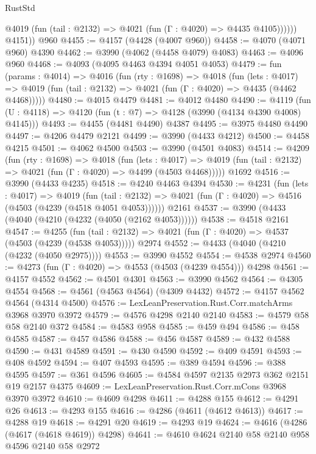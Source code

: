 \begin{lexlean}{RustStd}
\begin{coremodule}
              @4019 (fun (tail : @2132) => @4021 (fun (Γ : @4020) => @4435 @4105))))))
        @4151))
    @960
@4455 := @4157 (@4428 (@4007 @960))
@4458 := @4070 (@4071 @960) @4390
@4462 := @3990 (@4062 (@4458 @4079) @4083)
@4463 := @4096 @960
@4468 := @4093 (@4095 @4463 @4394 @4051 @4053)
@4479 := fun (params : @4014) =>
  @4016
    (fun (rty : @1698) =>
    @4018
      (fun (lets : @4017) =>
      @4019 (fun (tail : @2132) => @4021 (fun (Γ : @4020) => @4435 (@4462 @4468)))))
@4480 := @4015 @4479
@4481 := @4012 @4480
@4490 := @4119 (fun (U : @4118) => @4120 (fun (t : @7) => @4128 (@3990 (@4134 @4390 @4008) @4145)))
@4493 := @4455 (@4481 @4490) @4387
@4495 := @3975 @4480 @4490
@4497 := @4206 @4479 @2121
@4499 := @3990 (@4433 @4212)
@4500 := @4458 @4215
@4501 := @4062 @4500
@4503 := @3990 (@4501 @4083)
@4514 := @4209
    (fun (rty : @1698) =>
    @4018
      (fun (lets : @4017) =>
      @4019 (fun (tail : @2132) => @4021 (fun (Γ : @4020) => @4499 (@4503 @4468)))))
    @1692
@4516 := @3990 (@4433 @4235)
@4518 := @4240 @4463 @4394
@4530 := @4231
    (fun (lets : @4017) =>
    @4019
      (fun (tail : @2132) => @4021 (fun (Γ : @4020) => @4516 (@4503 (@4239 (@4518 @4051 @4053))))))
    @2161
@4537 := @3990 (@4433 (@4040 (@4210 (@4232 (@4050 (@2162 @4053))))))
@4538 := @4518 @2161
@4547 := @4255
    (fun (tail : @2132) => @4021 (fun (Γ : @4020) => @4537 (@4503 (@4239 (@4538 @4053)))))
    @2974
@4552 := @4433 (@4040 (@4210 (@4232 (@4050 @2975))))
@4553 := @3990 @4552
@4554 := @4538 @2974
@4560 := @4273 (fun (Γ : @4020) => @4553 (@4503 (@4239 @4554))) @4298
@4561 := @4157 @4552
@4562 := @4501 @4301
@4563 := @3990 @4562
@4564 := @4305 @4554
@4568 := @4561 (@4563 @4564) (@4309 @4432)
@4572 := @4157 @4562 @4564 (@4314 @4500)
@4576 := LexLeanPreservation.Rust.Corr.matchArms @3968 @3970 @3972
@4579 := @4576 @4298 @2140 @2140
@4583 := @4579 @58 @58 @2140 @372
@4584 := @4583 @958
@4585 := @459 @494
@4586 := @458 @4585
@4587 := @457 @4586
@4588 := @456 @4587
@4589 := @432 @4588
@4590 := @431 @4589
@4591 := @430 @4590
@4592 := @409 @4591
@4593 := @408 @4592
@4594 := @407 @4593
@4595 := @389 @4594
@4596 := @388 @4595
@4597 := @361 @4596
@4605 := @4584 @4597 @2135 @2973 @362 @2151 @19 @2157 @4375
@4609 := LexLeanPreservation.Rust.Corr.mCons @3968 @3970 @3972
@4610 := @4609 @4298
@4611 := @4288 @155
@4612 := @4291 @26
@4613 := @4293 @155
@4616 := @4286 (@4611 (@4612 @4613))
@4617 := @4288 @19
@4618 := @4291 @20
@4619 := @4293 @19
@4624 := @4616 (@4286 (@4617 (@4618 @4619)) @4298)
@4641 := @4610
    @4624
    @2140
    @58
    @2140
    @958
    @4596
    @2140
    @58
    @2972

\end{coremodule}
\end{lexlean}
